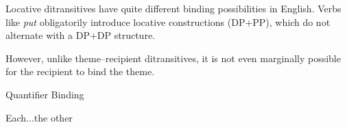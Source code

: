 Locative ditransitives have quite different binding possibilities in English. Verbs like \textit{put} obligatorily introduce locative constructions (DP+PP), which do not alternate with a DP+DP structure.
\begin{exe}\ex \cite[ex. 8]{Hallman.2015}
\begin{xlist}
\end{xlist}
\end{exe}%
However, unlike theme--recipient ditransitives, it is not even marginally possible for the recipient to bind the theme.
\begin{exe}
\ex Quantifier Binding
\begin{xlist}
\end{xlist}
\ex Each...the other
\begin{xlist}
\end{xlist}
\end{exe}%

